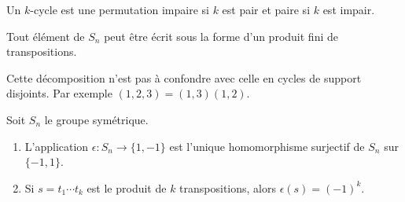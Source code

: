 \begin{lemma}       \label{LemhxnkMf}
    Un \( k\)-cycle est une permutation impaire si \( k\) est pair et paire si \( k\) est impair.
\end{lemma}

\begin{proposition} \label{PropPWIJbu}
    Tout élément de \( S_n\) peut être écrit sous la forme d'un produit fini de transpositions.
\end{proposition}
Cette décomposition n'est pas à confondre avec celle en cycles de support disjoints. Par exemple \( (1,2,3)=(1,3)(1,2)\).

\begin{proposition}  \label{ProphIuJrC}
    Soit \( S_n\) le groupe symétrique.
    \begin{enumerate}
        \item       \label{ITEMooBQKUooFTkvSu}
            L'application \( \epsilon\colon S_n\to \{ 1,-1 \}\) est l'unique homomorphisme surjectif de \( S_n\) sur \( \{ -1,1 \}\).
        \item
            Si \( s=t_1\cdots t_k\) est le produit de \( k\) transpositions, alors \( \epsilon(s)=(-1)^k\).
    \end{enumerate}
\end{proposition}


